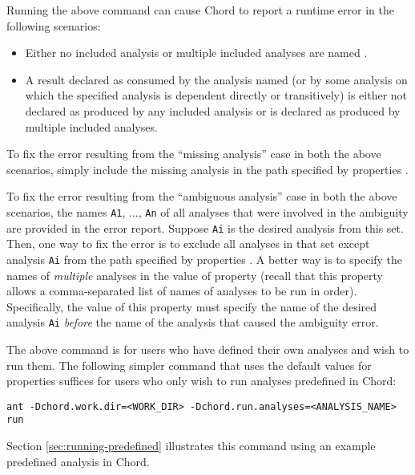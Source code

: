 Running the above command can cause Chord to report a runtime error in the
following scenarios:

\begin{itemize}
\item
Either no included analysis or multiple included analyses are named
.
\item
A result declared as consumed by the analysis named 
(or by some analysis on which the specified analysis is dependent directly or
transitively) is either not declared as produced by any included analysis or
is declared as produced by multiple included analyses.
\end{itemize}

To fix the error resulting from the ``missing analysis'' case in both the above
scenarios, simply include the missing analysis in the path specified by
properties .

To fix the error resulting from the ``ambiguous analysis'' case in both the
above scenarios, the names {\tt A1}, ..., {\tt An} of all analyses that were
involved in the ambiguity are provided in the error report.  Suppose {\tt Ai}
is the desired analysis from this set.  Then, one way to fix the error is to
exclude all analyses in that set except analysis {\tt Ai} from the path
specified by properties .  A better way is to
specify the names of {\it multiple} analyses in the value of property
 (recall that this property allows a comma-separated
list of names of analyses to be run in order).  Specifically, the value of
this property must specify the name of the desired analysis {\tt Ai}
{\it before} the name of the analysis that caused the ambiguity error.

The above command is for users who have defined their own analyses and wish
to run them.  The following simpler command that uses the default values for
properties  suffices for users who only wish to run
analyses predefined in Chord:

\begin{framed}
\begin{verbatim}
ant -Dchord.work.dir=<WORK_DIR> -Dchord.run.analyses=<ANALYSIS_NAME> run
\end{verbatim}
\end{framed}

Section \ref{sec:running-predefined} illustrates this command using an example
predefined analysis in Chord.

